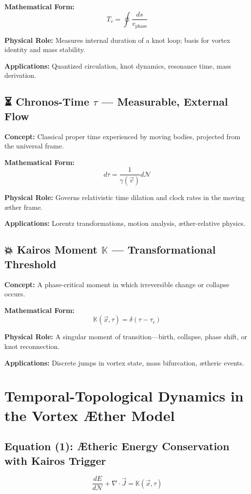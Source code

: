 \documentclass[12pt]{article}
\begin{document}
    \textbf{Mathematical Form:}
    \[
        T_v = \oint \frac{ds}{v_{\text{phase}}}
    \]

    \textbf{Physical Role:} Measures internal duration of a knot loop; basis for vortex identity and mass stability.

    \textbf{Applications:} Quantized circulation, knot dynamics, resonance time, mass derivation.

    \subsection*{⏳ Chronos-Time $\tau$ — Measurable, External Flow}
    \textbf{Concept:} Classical proper time experienced by moving bodies, projected from the universal frame.

    \textbf{Mathematical Form:}
    \[
        d\tau = \frac{1}{\gamma(\vec{v})} d\mathcal{N}
    \]

    \textbf{Physical Role:} Governs relativistic time dilation and clock rates in the moving æther frame.

    \textbf{Applications:} Lorentz transformations, motion analysis, æther-relative physics.

    \subsection*{💥 Kairos Moment $\mathbb{K}$ — Transformational Threshold}
    \textbf{Concept:} A phase-critical moment in which irreversible change or collapse occurs.

    \textbf{Mathematical Form:}
    \[
        \mathbb{K}(\vec{x}, \tau) = \delta(\tau - \tau_c)
    \]

    \textbf{Physical Role:} A singular moment of transition—birth, collapse, phase shift, or knot reconnection.

    \textbf{Applications:} Discrete jumps in vortex state, mass bifurcation, ætheric events.

    \appendix
\section{Temporal-Topological Dynamics in the Vortex Æther Model}

\subsection*{Equation (1): Ætheric Energy Conservation with Kairos Trigger}
\[
\frac{dE}{d\mathcal{N}} + \nabla \cdot \vec{J} = \mathbb{K}(\vec{x}, \tau)
\]
\end{document}
